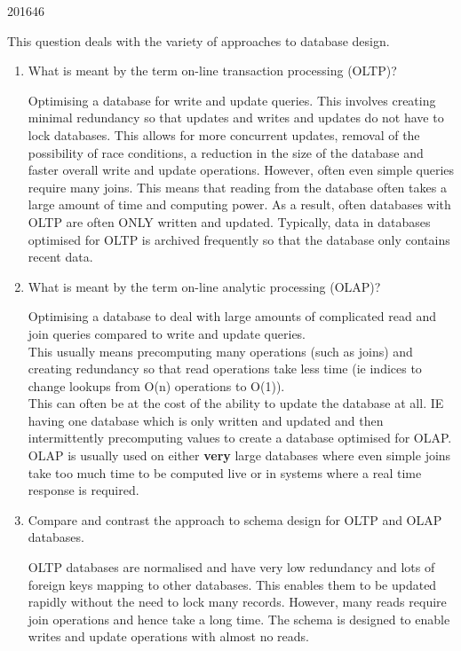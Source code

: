 \documentclass[10pt,\jkfside,a4paper]{article}
\begin{document}
\begin{examquestion}{2016}{4}{6}

This question deals with the variety of approaches to database design.

\begin{enumerate}

\item{What is meant by the term on-line transaction processing (OLTP)?}

Optimising a database for write and update queries. This involves creating minimal 
redundancy so that updates and writes and updates do not have to lock databases. 
This allows for more concurrent updates, removal of the possibility of race conditions, 
a reduction in the size of the database and faster overall write and update operations.
However, often even simple queries require many joins. This means that reading from the 
database often takes a large amount of time and computing power.
As a result, often databases with OLTP are often ONLY written and updated.
Typically, data in databases optimised for OLTP is archived frequently so that the 
database only contains recent data.

\item{What is meant by the term on-line analytic processing (OLAP)?}

Optimising a database to deal with large amounts of complicated read and 
join queries compared to write and update queries.\\
This usually means precomputing many operations (such as joins) and creating 
redundancy so that read operations take less time (ie indices to change lookups 
from O(n) operations to O(1)).\\
This can often be at the cost of the ability to update the database at all.
IE having one database which is only written and updated and then intermittently 
precomputing values to create a database optimised for OLAP.\\
OLAP is usually used on either \textbf{very} large databases where even simple joins 
take too much time to be computed live or in systems where a real time response is 
required.

\item{Compare and contrast the approach to schema design for OLTP and OLAP 
databases.}

OLTP databases are normalised and have very low redundancy and lots of foreign 
keys mapping to other databases. This enables them to be updated rapidly without 
the need to lock many records. However, many reads require join operations and 
hence take a long time. The schema is designed to enable writes and update operations 
with almost no reads.


\end{enumerate}
\end{examquestion}
\end{document}
